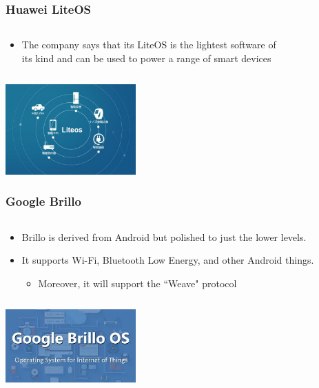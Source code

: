 \documentclass{beamer}
\begin{document}
\begin{frame}
	\frametitle{Huawei LiteOS}
	\begin{columns}[c]
		\begin{column}{30cm}
			\vspace{.1cm}
			\begin{itemize}
				\justifying
				\item The company says that its \textcolor{TextOrange}{LiteOS} is
				the \textcolor{TextGreen}{lightest} software of\\
				its kind and can be used to power a range of smart devices
			\end{itemize}
		\end{column}
	\end{columns}
	\vspace{.5cm}
	\hspace*{5.5cm} \includegraphics[width=5cm]{figs/huawei-liteos-logo.jpg}
\end{frame}

\begin{frame}
	\frametitle{Google Brillo}
	\begin{columns}[c]
		\begin{column}{30cm}
			\vspace{.1cm}
			\begin{itemize}
				\justifying
				\item Brillo is \textcolor{TextGreen}{derived} from Android
				but \textcolor{TextGreen}{polished} to just the lower levels.
				\item It supports Wi-Fi, Bluetooth Low Energy, and other Android things.
				\begin{itemize}
					\item Moreover, it will support the ``Weave" protocol
				\end{itemize}
			\end{itemize}
		\end{column}
	\end{columns}
	\vspace{.5cm}
	\hspace*{5.5cm} \includegraphics[width=5cm]{figs/google-brillo-logo.jpeg}
\end{frame}
\end{document}
